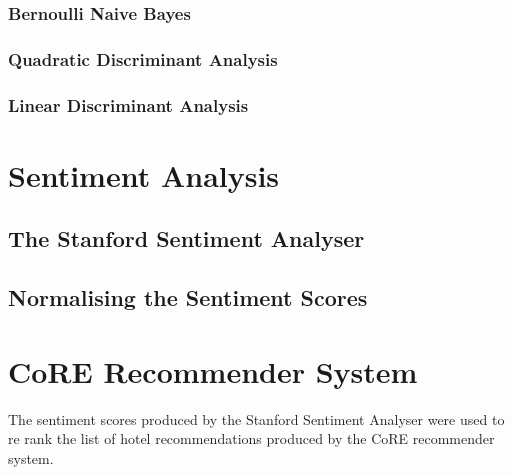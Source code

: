 \subsubsection*{Bernoulli Naive Bayes}

\subsubsection*{Quadratic Discriminant Analysis}

\subsubsection*{Linear Discriminant Analysis}


\section{Sentiment Analysis}

\subsection*{The Stanford Sentiment Analyser}
\subsection*{Normalising the Sentiment Scores}

\section{CoRE Recommender System}

The sentiment scores produced by the Stanford Sentiment Analyser were used to re rank the list of hotel recommendations produced by the CoRE recommender system.

